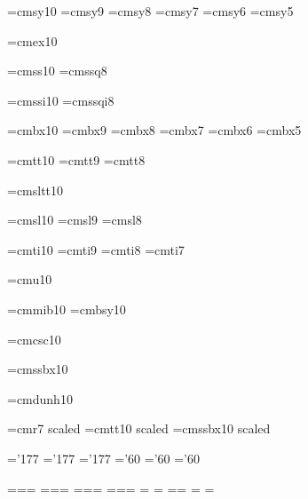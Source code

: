 \font\tensy=cmsy10 %
\font\preloaded=cmsy9
\font\preloaded=cmsy8
\font\sevensy=cmsy7
\font\preloaded=cmsy6
\font\fivesy=cmsy5

\font\tenex=cmex10 %

\font\preloaded=cmss10 %
\font\preloaded=cmssq8

\font\preloaded=cmssi10 %
\font\preloaded=cmssqi8

\font\tenbf=cmbx10 %
\font\preloaded=cmbx9
\font\preloaded=cmbx8
\font\sevenbf=cmbx7
\font\preloaded=cmbx6
\font\fivebf=cmbx5

\font\tentt=cmtt10 %
\font\preloaded=cmtt9
\font\preloaded=cmtt8

\font\preloaded=cmsltt10 %

\font\tensl=cmsl10 %
\font\preloaded=cmsl9
\font\preloaded=cmsl8

\font\tenit=cmti10 %
\font\preloaded=cmti9
\font\preloaded=cmti8
\font\preloaded=cmti7

\font\preloaded=cmu10 %

\font\preloaded=cmmib10 %
\font\preloaded=cmbsy10 %

\font\preloaded=cmcsc10 %

\font\preloaded=cmssbx10 %

\font\preloaded=cmdunh10 %

\font\preloaded=cmr7 scaled  %
\font\preloaded=cmtt10 scaled 
\font\preloaded=cmssbx10 scaled 



\let\preloaded=\undefined %

\skewchar\teni='177 \skewchar\seveni='177 \skewchar\fivei='177
\skewchar\tensy='60 \skewchar\sevensy='60 \skewchar\fivesy='60

=\tenrm {}=\sevenrm {}=\fiverm
\def\rm{\fam\z@\tenrm}
=\teni {}=\seveni {}=\fivei
\def\mit{\fam\@ne} \def\oldstyle{\fam\@ne\teni}
=\tensy {}=\sevensy {}=\fivesy
\def\cal{\fam\tw@}
=\tenex {}=\tenex {}=\tenex
\newfam\itfam \def\it{\fam\itfam\tenit} %
\textfont\itfam=\tenit
\newfam\slfam \def\sl{\fam\slfam\tensl} %
\textfont\slfam=\tensl
\newfam\bffam \def\bf{\fam\bffam\tenbf} %
\textfont\bffam=\tenbf \scriptfont\bffam=\sevenbf
\scriptscriptfont\bffam=\fivebf
\newfam\ttfam \def\tt{\fam\ttfam\tentt} %
\textfont\ttfam=\tentt

